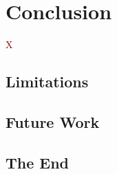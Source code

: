 \documentclass[../thesis]{subfiles}
\begin{document}
\chapter{Conclusion}\label{ch:conclusion}

\lettrine[lines=3]{\textcolor{Maroon}{X}}{} \fxfatal{}

\section{Limitations}
\fxfatal{}

\section{Future Work}
\fxfatal{}

\section{The End}
\fxfatal{}
\end{document}
